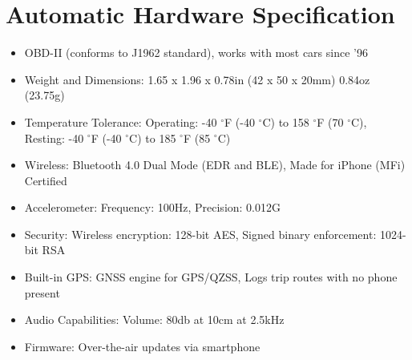 \chapter{Automatic Hardware Specification} %
\label{sec:automatic_hardware_specification}

\begin{itemize}
\item OBD-II (conforms to J1962 standard), works with most cars since ’96
\item Weight and Dimensions: 1.65 x 1.96 x 0.78in (42 x 50 x 20mm) 0.84oz (23.75g)
\item Temperature Tolerance: Operating: -40 \ensuremath{^\circ}F (-40 \ensuremath{^\circ}C) to 158 \ensuremath{^\circ}F (70 \ensuremath{^\circ}C), Resting: -40 \ensuremath{^\circ}F (-40 \ensuremath{^\circ}C) to 185 \ensuremath{^\circ}F (85 \ensuremath{^\circ}C)
\item Wireless: Bluetooth 4.0 Dual Mode (EDR and BLE), Made for iPhone (MFi) Certified
\item Accelerometer: Frequency: 100Hz, Precision: 0.012G
\item Security: Wireless encryption: 128-bit AES, Signed binary enforcement: 1024-bit RSA
\item Built-in GPS: GNSS engine for GPS/QZSS, Logs trip routes with no phone present
\item Audio Capabilities: Volume: 80db at 10cm at 2.5kHz
\item Firmware: Over-the-air updates via smartphone
\end{itemize}
